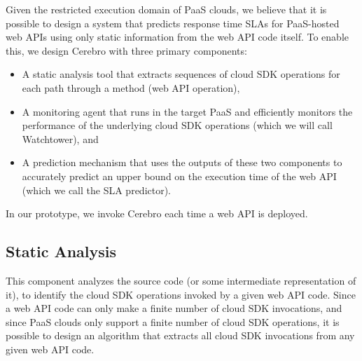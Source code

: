Given the restricted execution domain of PaaS clouds, we believe that it is possible
to design a system that predicts response time SLAs for PaaS-hosted web APIs using only
static information from the web API code itself.  To enable this, we design Cerebro
with three primary components:
\begin{itemize}
\item A static analysis tool that extracts sequences of cloud SDK operations for 
each path through a method (web API operation),
\item A monitoring agent that runs in the target PaaS and efficiently monitors 
the performance of the underlying cloud SDK operations (which we will call Watchtower), and
\item A prediction mechanism that uses the outputs of these two components to accurately predict an upper bound on the execution time of the web API (which we call the SLA predictor).
\end{itemize}
In our prototype, we invoke Cerebro each time a 
web API is deployed.



\subsection{Static Analysis}
 This component analyzes the source code 
(or some intermediate representation of it), to identify
 the cloud SDK operations invoked by a given web API code. 
Since a web API code can only make a finite
 number of cloud SDK invocations, and since PaaS clouds only support a finite number of cloud
 SDK operations, it is possible to design an algorithm that
 extracts all cloud SDK invocations from any given web API code. 

